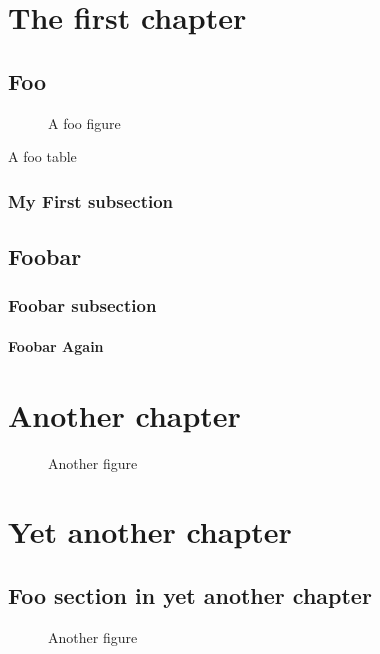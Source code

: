 \documentclass{book}
\begin{document}
\tableofcontents
\listoffigures
\listoftables


\chapter{The first chapter}
\section{Foo}


\begin{figure}

\caption{A foo figure}
\end{figure}

\begin{table}
\caption{A foo table}
\end{table}



\subsection{My First subsection}
\blindtext
\section{Foobar}
\subsection{Foobar subsection}
\blindtext
\subsubsection{Foobar Again}
\blindtext


\ResumeAllSuspendedCounters

\chapter{Another chapter}


\begin{figure}
\caption{Another figure}
\end{figure}




\chapter{Yet another chapter}

\section{Foo section in yet another chapter}

\begin{figure}
\caption{Another figure}
\end{figure}
\end{document}
